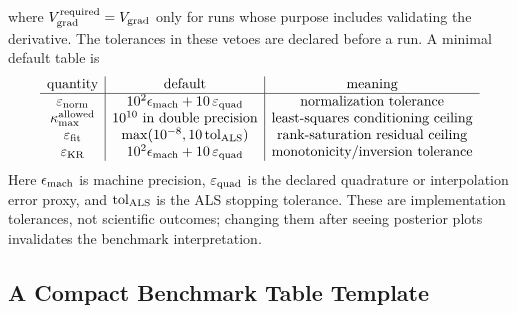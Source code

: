 \documentclass[11pt]{article}
\numberwithin{equation}{section}
\begin{document}
where \(V_{\rm grad}^{\rm required}=V_{\rm grad}\) only for runs whose purpose
includes validating the derivative.
The tolerances in these vetoes are declared before a run.  A minimal default
table is
\begin{equation}
\begin{array}{c|c|c}
\text{quantity} & \text{default} & \text{meaning}\\
\hline
\varepsilon_{\rm norm}
&10^2\epsilon_{\rm mach}+10\,\varepsilon_{\rm quad}
&\text{normalization tolerance}\\
\kappa_{\rm max}^{\rm allowed}
&10^{10}\text{ in double precision}
&\text{least-squares conditioning ceiling}\\
\varepsilon_{\rm fit}
&\max(10^{-8},10\,{\rm tol}_{\rm ALS})
&\text{rank-saturation residual ceiling}\\
\varepsilon_{\rm KR}
&10^2\epsilon_{\rm mach}+10\,\varepsilon_{\rm quad}
&\text{monotonicity/inversion tolerance}
\end{array}
\label{eq:p27-r9}
\end{equation}
Here \(\epsilon_{\rm mach}\) is machine precision, \(\varepsilon_{\rm quad}\)
is the declared quadrature or interpolation error proxy, and
\({\rm tol}_{\rm ALS}\) is the ALS stopping tolerance.  These are
implementation tolerances, not scientific outcomes; changing them after seeing
posterior plots invalidates the benchmark interpretation.

\subsection{A Compact Benchmark Table Template}
\end{document}
